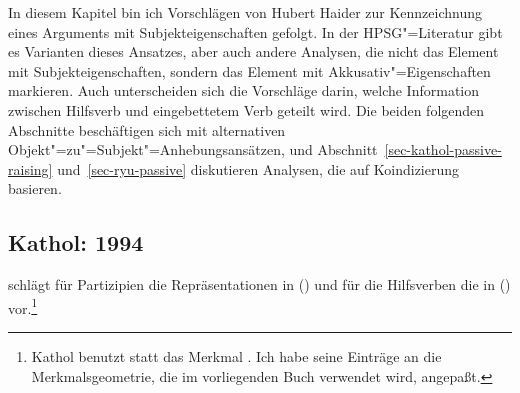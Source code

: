 {%


In diesem Kapitel bin ich Vorschlägen von Hubert Haider zur Kennzeichnung eines Arguments 
mit Subjekteigenschaften gefolgt. In der HPSG"=Literatur gibt es Varianten dieses Ansatzes,
aber auch andere Analysen, die nicht das Element mit Subjekteigenschaften, sondern
das Element mit Akkusativ"=Eigenschaften markieren. Auch unterscheiden sich die Vorschläge
darin, welche Information zwischen Hilfsverb und eingebettetem Verb geteilt wird.
Die beiden folgenden Abschnitte beschäftigen sich mit alternativen Objekt"=zu"=Subjekt"=Anhebungsansätzen,
und Abschnitt~\ref{sec-kathol-passive-raising} und~\ref{sec-ryu-passive} diskutieren
Analysen, die auf Koindizierung basieren.



\subsection{Kathol: 1994}
\label{sec-kathol-passive}

\mbox{}\citet[Kapitel~7.3.3]{Kathol94a} schlägt für Partizipien die Repräsentationen in
() und für die Hilfsverben die in () vor.\footnote{
        Kathol benutzt statt \subcat das Merkmal \comps. Ich habe seine Einträge an die Merkmalsgeometrie,
        die im vorliegenden Buch verwendet wird, angepaßt.%
}

}
